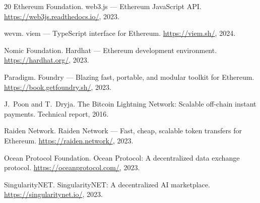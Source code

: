\documentclass[11pt]{article}
\begin{document}
\begin{thebibliography}{20}
{Ethereum Foundation}.
\newblock web3.js --- Ethereum JavaScript API.
\newblock \url{https://web3js.readthedocs.io/}, 2023.

{wevm}.
\newblock viem --- TypeScript interface for Ethereum.
\newblock \url{https://viem.sh/}, 2024.

{Nomic Foundation}.
\newblock Hardhat --- Ethereum development environment.
\newblock \url{https://hardhat.org/}, 2023.

{Paradigm}.
\newblock Foundry --- Blazing fast, portable, and modular toolkit for Ethereum.
\newblock \url{https://book.getfoundry.sh/}, 2023.

J.~Poon and T.~Dryja.
\newblock The {Bitcoin Lightning Network}: Scalable off-chain instant payments.
\newblock Technical report, 2016.

{Raiden Network}.
\newblock Raiden Network --- Fast, cheap, scalable token transfers for Ethereum.
\newblock \url{https://raiden.network/}, 2023.

{Ocean Protocol Foundation}.
\newblock Ocean Protocol: A decentralized data exchange protocol.
\newblock \url{https://oceanprotocol.com/}, 2023.

{SingularityNET}.
\newblock SingularityNET: A decentralized AI marketplace.
\newblock \url{https://singularitynet.io/}, 2023.

\end{thebibliography}
\end{document}

